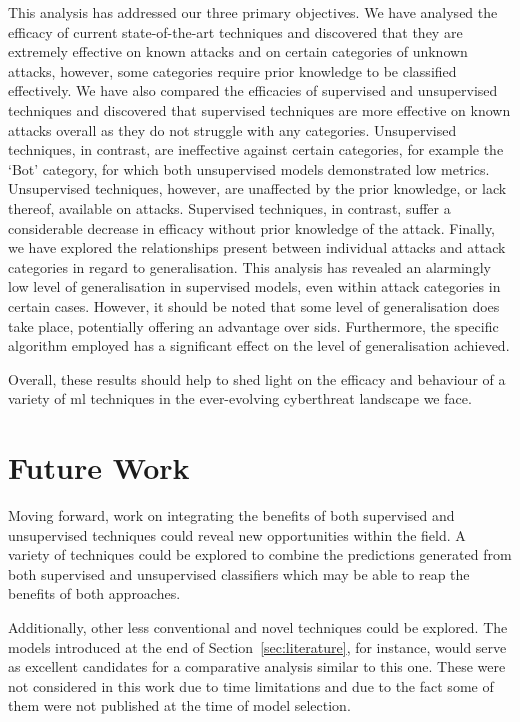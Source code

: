 This analysis has addressed our three primary objectives. We have analysed the
efficacy of current state-of-the-art techniques and discovered that they are
extremely effective on known attacks and on certain categories of unknown
attacks, however, some categories require prior knowledge to be classified
effectively. We have also compared the efficacies of supervised and
unsupervised techniques and discovered that supervised techniques are more
effective on known attacks overall as they do not struggle with any categories.
Unsupervised techniques, in contrast, are ineffective against certain
categories, for example the `Bot' category, for which both unsupervised models
demonstrated low metrics. Unsupervised techniques, however, are unaffected by
the prior knowledge, or lack thereof, available on attacks. Supervised
techniques, in contrast, suffer a considerable decrease in efficacy without
prior knowledge of the attack. Finally, we have explored the relationships
present between individual attacks and attack categories in regard to
generalisation. This analysis has revealed an alarmingly low level of
generalisation in supervised models, even within attack categories in certain
cases. However, it should be noted that some level of generalisation does take
place, potentially offering an advantage over \gls{sids}. Furthermore, the
specific algorithm employed has a significant effect on the level of
generalisation achieved.

Overall, these results should help to shed light on the efficacy and behaviour
of a variety of \gls{ml} techniques in the ever-evolving cyberthreat landscape
we face.

\section{Future Work}%
\label{sec:future}

Moving forward, work on integrating the benefits of both supervised and
unsupervised techniques could reveal new opportunities within the field. A
variety of techniques could be explored to combine the predictions generated
from both supervised and unsupervised classifiers which may be able to reap the
benefits of both approaches.

Additionally, other less conventional and novel techniques could be explored.
The models introduced at the end of Section~\ref{sec:literature}, for instance,
would serve as excellent candidates for a comparative analysis similar to this
one. These were not considered in this work due to time limitations and due to
the fact some of them were not published at the time of model selection.

